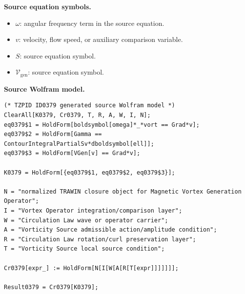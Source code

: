 \begin{minipage}[t]{0.49\linewidth}
\begingroup
\small
\raggedright
\textbf{Source equation symbols.}\par
\begin{itemize}[leftmargin=1.35em,itemsep=1pt,topsep=1pt,parsep=0pt]
    \item $\omega$: angular frequency term in the source equation.
    \item $v$: velocity, flow speed, or auxiliary comparison variable.
    \item $S$: source equation symbol.
    \item $\mathcal{V}_{\mathrm{gen}}$: source equation symbol.
\end{itemize}
\endgroup
\end{minipage}\hfill
\begin{minipage}[t]{0.47\linewidth}
\begingroup
\scriptsize
\raggedright
\textbf{Source Wolfram model.}\par
\begin{Verbatim}[fontsize=\tiny,breaklines=true,breakanywhere=true]
(* TZPID ID0379 generated source Wolfram model *)
ClearAll[K0379, Cr0379, T, R, A, W, I, N];
eq0379$1 = HoldForm[boldsymbol[omega]*_*vort == Grad*v];
eq0379$2 = HoldForm[Gamma == ContourIntegralPartialSv*dboldsymbol[ell]];
eq0379$3 = HoldForm[VGen[v] == Grad*v];

K0379 = HoldForm[{eq0379$1, eq0379$2, eq0379$3}];

N = "normalized TRAWIN closure object for Magnetic Vortex Generation Operator";
I = "Vortex Operator integration/comparison layer";
W = "Circulation Law wave or operator carrier";
A = "Vorticity Source admissible action/amplitude condition";
R = "Circulation Law rotation/curl preservation layer";
T = "Vorticity Source local source condition";

Cr0379[expr_] := HoldForm[N[I[W[A[R[T[expr]]]]]]];

Result0379 = Cr0379[K0379];
\end{Verbatim}
\endgroup
\end{minipage}

